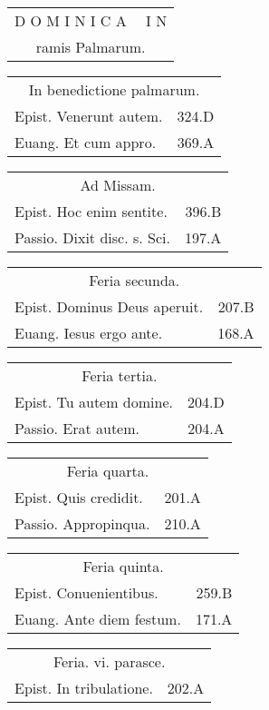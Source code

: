 \documentclass[a5paper,10pt]{book}
\begin{document}
\begin{multicols}{2}
\begin{tabular}{c}
\color{red} \large D O M I N I C A \ \ I N\\
\color{red} ramis Palmarum.\\
\end{tabular}
\par
\vspace{-.5em}
\begin{tabular}{l r}
\multicolumn{2}{c}{\color{red} In benedictione palmarum.}\\
Epist. Venerunt autem. & 324.D\\
Euang. Et cum appro. & 369.A\\
\end{tabular}
\begin{tabular}{l r}
\multicolumn{2}{c}{\color{red} Ad Missam.}\\
Epist. Hoc enim sentite. & 396.B\\
Passio. Dixit disc. s. Sci. & 197.A\\
\end{tabular}
\begin{tabular}{l r}
\multicolumn{2}{c}{\color{red} Feria secunda.}\\
Epist. Dominus Deus aperuit. & 207.B\\
Euang. Iesus ergo ante. & 168.A\\
\end{tabular}
\begin{tabular}{l r}
\multicolumn{2}{c}{\color{red} Feria tertia.}\\
Epist. Tu autem domine. & 204.D\\
Passio. Erat autem. & 204.A\\
\end{tabular}
\begin{tabular}{l r}
\multicolumn{2}{c}{\color{red} Feria quarta.}\\
Epist. Quis credidit. & 201.A\\
Passio. Appropinqua. & 210.A\\
\end{tabular}
\begin{tabular}{l r}
\multicolumn{2}{c}{\color{red} Feria quinta.}\\
Epist. Conuenientibus. & 259.B\\
Euang. Ante diem festum. & 171.A\\
\end{tabular}
\begin{tabular}{l r}
\multicolumn{2}{c}{\color{red} Feria. vi. parasce.}\\
Epist. In tribulatione. & 202.A\\

\end{tabular}
\end{multicols}
\end{document}
